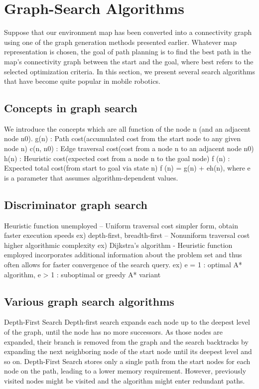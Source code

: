 \documentclass[twoside]{article}
\begin{document}
\section{Graph-Search Algorithms}
Suppose that our environment map has been converted into a connectivity graph using one of the graph generation methods presented earlier. Whatever map representation is chosen, the goal of path planning is to find the best path in the map’s connectivity graph between the start and the goal, where best refers to the selected optimization criteria. In this section, we present several search algorithms that have become
quite popular in mobile robotics.



\subsection{Concepts in graph search}
We introduce the concepts which are all function of the node n (and an adjacent node n0).
g(n) : Path cost(accumulated cost from the start node to any given node n)
c(n, n0) : Edge traversal cost(cost from a node n to an adjacent node n0)
h(n) : Heuristic cost(expected cost from a node n to the goal node)
f (n) : Expected total cost(from start to goal via state n)
f (n) = g(n) + eh(n), where e is a parameter that assumes algorithm-dependent values.

\subsection{Discriminator graph search}
Heuristic function unemployed
– Uniform traversal cost simpler form, obtain faster execution speeds 
ex) depth-first, breadth-first
– Nonuniform traversal cost higher algorithmic complexity
ex) Dijkstra’s algorithm
- Heuristic function employed incorporates additional information about the problem set and thus often allows for faster convergence of the search query.
ex) e = 1 : optimal A* algorithm, e > 1 : suboptimal or greedy A* variant

\subsection{Various graph search algorithms}
Depth-First Search
Depth-first search expands each node up to the deepest level of the graph, until the node has no more successors. As those nodes are expanded, their branch is removed from the graph and the search backtracks by expanding the next neighboring node of the start node until its deepest level and so on.
Depth-First Search stores only a single path from the start nodes for each node on the path, leading to a lower memory requirement. However, previously visited nodes might be visited and the algorithm might enter redundant paths.
\end{document}
